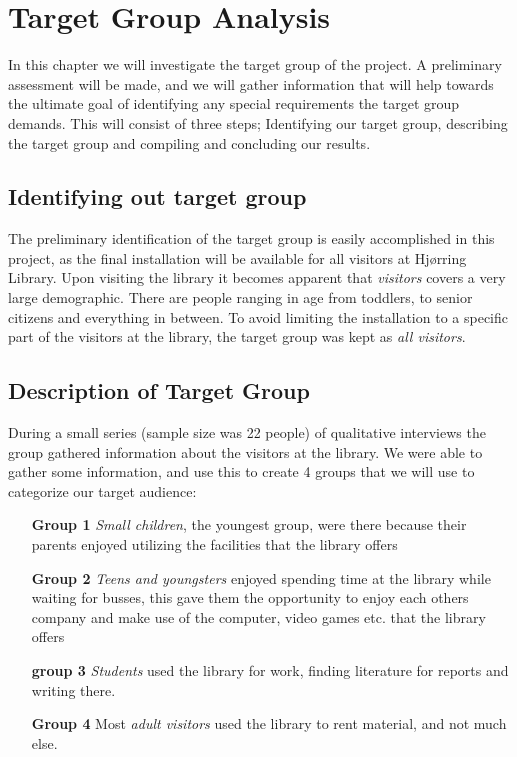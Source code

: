 \chapter{Target Group Analysis}

In this chapter we will investigate the target group of the project. A preliminary assessment will be made, and we will gather information that will help towards the ultimate goal of identifying any special requirements the target group demands. This will consist of three steps; Identifying our target group, describing the target group and compiling and concluding our results.

\section{Identifying out target group}
The preliminary identification of the target group is easily accomplished in this project, as the final installation will be available for all visitors at Hj{\o}rring Library. Upon visiting the library it becomes apparent that \textit{visitors} covers a very large demographic. There are people ranging in age from toddlers, to senior citizens and everything in between. To avoid limiting the installation to a specific part of the visitors at the library, the target group was kept as \textit{all visitors}.

\section{Description of Target Group}
During a small series (sample size was 22 people) of qualitative interviews the group gathered information about the visitors at the library. We were able to gather some information, and use this to create 4 groups that we will use to categorize our target audience:

\begin{itemize}

\item[\textbf{Group 1} \textit{Small children}, the youngest group, were there because their parents enjoyed utilizing the facilities that the library offers]
\item[\textbf{Group 2} \textit{Teens and youngsters} enjoyed spending time at the library while waiting for busses, this gave them the opportunity to enjoy each others company and make use of the computer, video games etc. that the library offers]
\item[\textbf{group 3} \textit{Students} used the library for work, finding literature for reports and writing there.]
\item[\textbf{Group 4} Most \textit{adult visitors} used the library to rent material, and not much else.]

\end{itemize}

